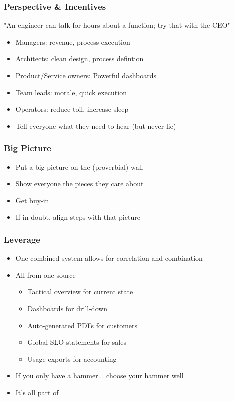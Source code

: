 \documentclass[t]{beamer}
\begin{document}
\begin{frame}
	\frametitle{Perspective \& Incentives}
	"An engineer can talk for hours about a function; try that with the CEO"
	\vfill
	\begin{itemize}
		\item Managers: revenue, process execution
		\item Architects: clean design, process defintion
		\item Product/Service owners: Powerful dashboards
		\item Team leads: morale, quick execution
		\item Operators: reduce toil, increase sleep
		\item Tell everyone what they need to hear (but never lie)
	\end{itemize}
	\vfill
\end{frame}

\begin{frame}
	\frametitle{Big Picture}
	\begin{itemize}
		\item Put a big picture on the (proverbial) wall
		\item Show everyone the pieces they care about
		\item Get buy-in
		\item If in doubt, align steps with that picture
	\end{itemize}
\end{frame}

\begin{frame}
	\frametitle{Leverage}
	\begin{itemize}
		\item One combined system allows for correlation and combination
		\item All from one source
		\begin{itemize}
			\item Tactical overview for current state
			\item Dashboards for drill-down
			\item Auto-generated PDFs for customers
			\item Global SLO statements for sales
			\item Usage exports for accounting
		\end{itemize}
	\item If you only have a hammer... choose your hammer well
	\item It's all part of 
	\end{itemize}
\end{frame}
\end{document}
